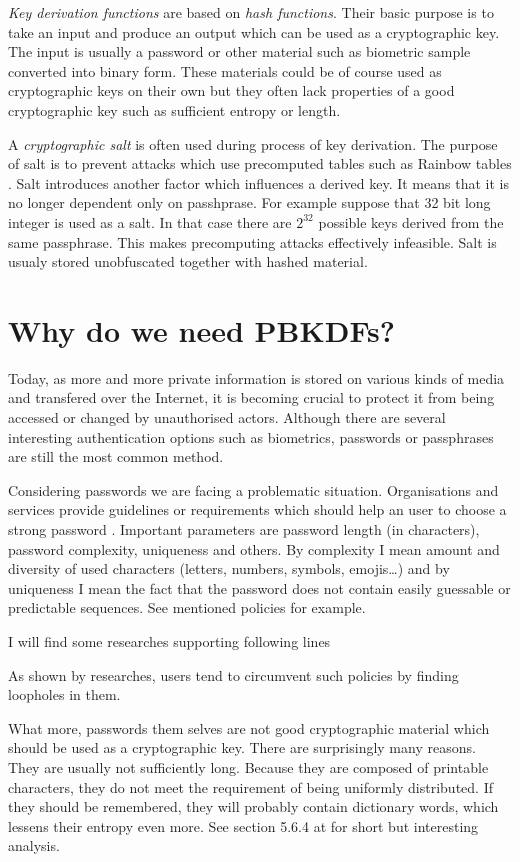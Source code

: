 \documentclass[nolof]{fithesis3}
\begin{document}
\emph{Key derivation functions} are based on \emph{hash functions}. Their basic purpose is to take an input and produce an output which can be used as a cryptographic key. The input is usually a password or other material such as biometric sample converted into binary form. These materials could be of course used as cryptographic keys on their own but they often lack properties of a good cryptographic key such as sufficient entropy or length. 

A \emph{cryptographic salt} is often used during process of key derivation. The purpose of salt is to prevent attacks which use precomputed tables such as Rainbow tables \parencite{rainbowtables}. Salt introduces another factor which influences a derived key. It means that it is no longer dependent only on passhprase. For example suppose that 32 bit long integer is used as a salt. In that case there are \(2^{32}\) possible keys derived from the same passphrase. This makes precomputing attacks effectively infeasible. Salt is usualy stored unobfuscated together with hashed material.

\section{Why do we need PBKDFs?}
\label{whypbkdfs}
Today, as more and more private information is stored on various kinds of media and transfered over the Internet, it is becoming crucial to protect it from being accessed or changed by unauthorised actors. Although there are several interesting authentication options such as biometrics, passwords or passphrases are still the most common method.

Considering passwords we are facing a problematic situation. Organisations and services provide guidelines or requirements which should help an user to choose a strong password \parencites{nistpasswords}{sanspasswordguidelines}. Important parameters are password length (in characters), password complexity, uniqueness and others. By complexity I mean amount and diversity of used characters (letters, numbers, symbols, emojis\dots) and by uniqueness I mean the fact that the password does not contain easily guessable or predictable sequences. See mentioned policies for example.

I will find some researches supporting following lines

As shown by researches, users tend to circumvent such policies by finding loopholes in them. %

What more, passwords them selves are not good cryptographic material which should be used as a cryptographic key. There are surprisingly many reasons. They are usually not sufficiently long. Because they are composed of printable characters, they do not meet the requirement of being uniformly distributed. If they should be remembered, they will probably contain dictionary words, which lessens their entropy even more. See section 5.6.4 at \parencite{itmc14} for short but interesting analysis.
\end{document}
